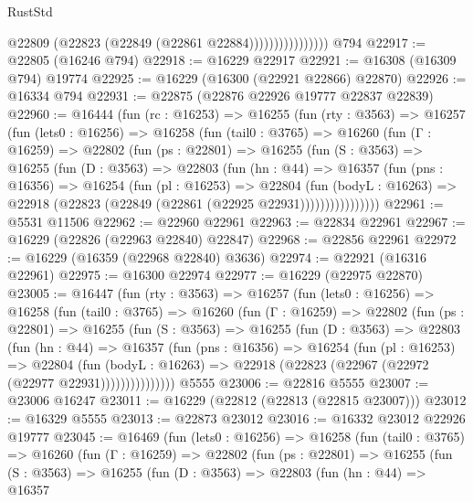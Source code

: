 \begin{lexlean}{RustStd}
\begin{coremodule}
                            @22809 (@22823 (@22849 (@22861 @22884))))))))))))))))
    @794
@22917 := @22805 (@16246 @794)
@22918 := @16229 @22917
@22921 := @16308 (@16309 @794) @19774
@22925 := @16229 (@16300 (@22921 @22866) @22870)
@22926 := @16334 @794
@22931 := @22875 (@22876 @22926 @19777 @22837 @22839)
@22960 := @16444
    (fun (rc : @16253) =>
    @16255
      (fun (rty : @3563) =>
      @16257
        (fun (lets0 : @16256) =>
        @16258
          (fun (tail0 : @3765) =>
          @16260
            (fun (Γ : @16259) =>
            @22802
              (fun (ps : @22801) =>
              @16255
                (fun (S : @3563) =>
                @16255
                  (fun (D : @3563) =>
                  @22803
                    (fun (hn : @44) =>
                    @16357
                      (fun (pns : @16356) =>
                      @16254
                        (fun (pl : @16253) =>
                        @22804
                          (fun (bodyL : @16263) =>
                          @22918 (@22823 (@22849 (@22861 (@22925 @22931))))))))))))))))
@22961 := @5531 @11506
@22962 := @22960 @22961
@22963 := @22834 @22961
@22967 := @16229 (@22826 (@22963 @22840) @22847)
@22968 := @22856 @22961
@22972 := @16229 (@16359 (@22968 @22840) @3636)
@22974 := @22921 (@16316 @22961)
@22975 := @16300 @22974
@22977 := @16229 (@22975 @22870)
@23005 := @16447
    (fun (rty : @3563) =>
    @16257
      (fun (lets0 : @16256) =>
      @16258
        (fun (tail0 : @3765) =>
        @16260
          (fun (Γ : @16259) =>
          @22802
            (fun (ps : @22801) =>
            @16255
              (fun (S : @3563) =>
              @16255
                (fun (D : @3563) =>
                @22803
                  (fun (hn : @44) =>
                  @16357
                    (fun (pns : @16356) =>
                    @16254
                      (fun (pl : @16253) =>
                      @22804
                        (fun (bodyL : @16263) =>
                        @22918 (@22823 (@22967 (@22972 (@22977 @22931)))))))))))))))
    @5555
@23006 := @22816 @5555
@23007 := @23006 @16247
@23011 := @16229 (@22812 (@22813 (@22815 @23007)))
@23012 := @16329 @5555
@23013 := @22873 @23012
@23016 := @16332 @23012 @22926 @19777
@23045 := @16469
    (fun (lets0 : @16256) =>
    @16258
      (fun (tail0 : @3765) =>
      @16260
        (fun (Γ : @16259) =>
        @22802
          (fun (ps : @22801) =>
          @16255
            (fun (S : @3563) =>
            @16255
              (fun (D : @3563) =>
              @22803
                (fun (hn : @44) =>
                @16357

\end{coremodule}
\end{lexlean}
